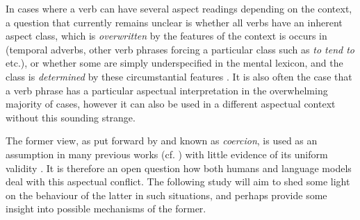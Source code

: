 In cases where a verb can have several aspect readings depending on the context, a question that currently remains unclear is whether all verbs have an inherent aspect class, which is \emph{overwritten} by the features of the context is occurs in (temporal adverbs, other verb phrases forcing a particular class such as \emph{to tend to} etc.), or whether some are simply underspecified in the mental lexicon, and the class is \emph{determined} by these circumstantial features \citep{https://doi.org/10.11588/huplc.2017.0.37820}. It is also often the case that a verb phrase has a particular aspectual interpretation in the overwhelming majority of cases, however it can also be used in a different aspectual context without this sounding strange.

The former view, as put forward by \citet{moens-steedman-1988-temporal} and known as \emph{coercion}, is used as an assumption in many previous works (cf. \citet{Swart+2019+321+349}) with little evidence of its uniform validity \citep{https://doi.org/10.11588/huplc.2017.0.37820}. It is therefore an open question how both humans and language models deal with this aspectual conflict. The following study will aim to shed some light on the behaviour of the latter in such situations, and perhaps provide some insight into possible mechanisms of the former.